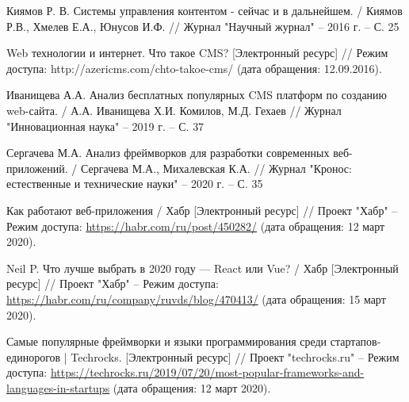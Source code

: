 \begin{thebibliography}{00}
        Киямов Р. В. Системы управления контентом - сейчас и в дальнейшем.
        /
        Киямов Р.В., Хмелев Е.А., Юнусов И.Ф.
        //
        Журнал "Научный журнал"
        --
        2016 г.
        --
        С. 25

        Web технологии и интернет. Что такое CMS? [Электронный ресурс] //
        Режим доступа:
        http://azericms.com/chto-takoe-cms/
        (дата обращения: 12.09.2016).


        Иванищева А.А. Анализ бесплатных популярных CMS платформ по созданию web-сайта.
        /
        А.А. Иванищева Х.И. Комилов, М.Д. Гехаев
        //
        Журнал "Инновационная наука"
        --
        2019 г.
        --
        С. 37

        Сергачева М.А. Анализ фреймворков для разработки современных веб-приложений.
        /
        Сергачева М.А., Михалевская К.А.
        //
        Журнал "Кронос: естественные и технические науки"
        --
        2020 г.
        --
        С. 35

        Как работают веб-приложения / Хабр
        [Электронный ресурс]
        //
        Проект "Хабр"
        --
        Режим доступа:
        \href{https://habr.com/ru/post/450282/}{https://habr.com/ru/post/450282/}
        (дата обращения: 12 март 2020).

        Neil P. Что лучше выбрать в 2020 году — React или Vue? / Хабр
        [Электронный ресурс]
        //
        Проект "Хабр"
        --
        Режим доступа:
        \href{https://habr.com/ru/company/ruvds/blog/470413/}{https://habr.com/ru/company/ruvds/blog/470413/}
        (дата обращения: 15 март 2020).

        Самые популярные фреймворки и языки программирования среди стартапов-единорогов | Techrocks.
        [Электронный ресурс]
        //
        Проект "techrocks.ru"
        --
        Режим доступа:
        \href{https://techrocks.ru/2019/07/20/most-popular-frameworks-and-languages-in-startups}{https://techrocks.ru/2019/07/20/most-popular-frameworks-and-languages-in-startups}
        (дата обращения: 12 март 2020).



\end{thebibliography}
